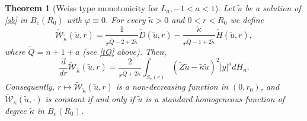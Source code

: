\documentclass[11pt]{amsart}
\theoremstyle{plain}
\newtheorem{thrm}{Theorem}[section]
\numberwithin{equation}{section}
\begin{document}
\begin{thrm}[Weiss type monotonicity for $L_a, -1<a<1$]\label{T:weissext}
Let $\tilde u$ be a solution of \eqref{sb} in $B_e(R_0)$ with ${\varphi}\equiv 0$. For every $\tilde \kappa > 0$ and $0<r<R_0$ we define
\begin{equation}\label{tW}
\tilde{\mathcal W}_{\tilde \kappa}(\tilde u,r) = \frac{1}{r^{\tilde Q-2+2\tilde \kappa}}\tilde D(\tilde u,r)-\frac{\tilde \kappa}{r^{\tilde Q-1+2\tilde \kappa}}\tilde H(\tilde u,r),
 \end{equation}
where $\tilde Q =  n+1+a$ (see \eqref{tQ} above). Then,
 \begin{equation}\label{tW'}
  \frac{d}{dr}\tilde{\mathcal W}_{\tilde \kappa}(\tilde u,r)=\frac{2}{r^{\tilde Q+2\tilde \kappa}}\int_{{S_{e}(r)}}(\tilde Z \tilde u-\tilde \kappa \tilde u)^2 |y|^a dH_{n}.
 \end{equation}
 Consequently, $r\mapsto \mathcal{\tilde W}_{\tilde \kappa}(\tilde u,r)$ is a non-decreasing function in $(0,r_0)$, and $\tilde{\mathcal W}_{\tilde \kappa}(\tilde u,\cdot)$ is constant if and only if $\tilde u$ is a standard homogeneous function of degree $\tilde \kappa$ in $B_{e}(R_0)$.
\end{thrm}
\end{document}
